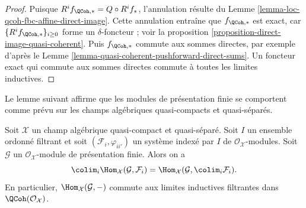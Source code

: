 \begin{proof}
Puisque $R^if_{\QCoh, *} = Q \circ R^if_*$, l'annulation résulte du
Lemme \ref{lemma-loc-qcoh-fbc-affine-direct-image}.
Cette annulation entraîne que $f_{\QCoh, *}$ est exact, car
$\{R^if_{\QCoh, *}\}_{i \geq 0}$ forme un $\delta$-foncteur ; voir la
proposition \ref{proposition-direct-image-quasi-coherent}.
Puis $f_{\QCoh, *}$ commute aux sommes directes, par exemple d'après le
Lemme \ref{lemma-quasi-coherent-pushforward-direct-sums}.
Un foncteur exact qui commute aux sommes directes commute
à toutes les limites inductives.
\end{proof}

\noindent
Le lemme suivant affirme que les modules de présentation finie se comportent
comme prévu sur les champs algébriques quasi-compacts et quasi-séparés.

\begin{lemma}
\label{lemma-finite-presentation-quasi-compact-colimit}
Soit $\mathcal{X}$ un champ algébrique quasi-compact et quasi-séparé.
Soit $I$ un ensemble ordonné filtrant et soit $(\mathcal{F}_i, \varphi_{ii'})$ un
système indexé par $I$ de $\mathcal{O}_\mathcal{X}$-modules. Soit $\mathcal{G}$ un
$\mathcal{O}_\mathcal{X}$-module de présentation finie. Alors on a
$$
\colim_i \Hom_\mathcal{X}(\mathcal{G}, \mathcal{F}_i)
=
\Hom_\mathcal{X}(\mathcal{G}, \colim_i \mathcal{F}_i).
$$
En particulier, $\Hom_\mathcal{X}(\mathcal{G}, -)$ commute aux limites
inductives filtrantes dans $\QCoh(\mathcal{O}_\mathcal{X})$.
\end{lemma}

